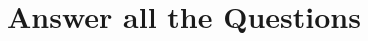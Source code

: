 \documentclass[a4paper,12pt]{vitexam}
\begin{document}
	
	
	
\part{Answer all the  Questions}
\end{document}
